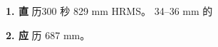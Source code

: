 \documentclass[11pt,a4paper]{article}
\begin{document}
\textbf{1. {\cjkfont 直}\allowbreak{}} {\cjkfont 历}\allowbreak{}300 {\cjkfont 秒}\allowbreak{} 829 mm HRMS{\cjkfont 。}\allowbreak{} 34–36 mm {\cjkfont 的}\allowbreak{}

\textbf{2. {\cjkfont 应}\allowbreak{}} {\cjkfont 历}\allowbreak{} 687 mm{\cjkfont 。}\allowbreak{}
\end{document}
